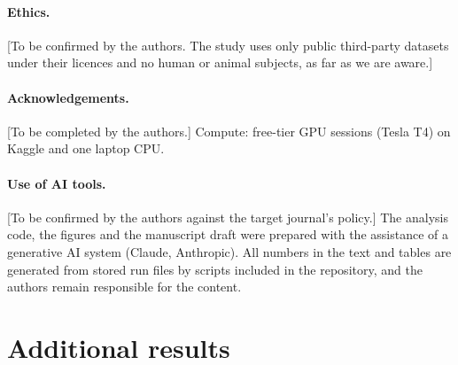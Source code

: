 \documentclass[11pt]{article}
\newcommand{\todo}[1]{{\color{red}[#1]}}
\newcommand{\iou}{IoU}
\begin{document}
\paragraph{Ethics.} \todo{To be confirmed by the authors. The study uses only public third-party datasets under their licences and no human or animal subjects, as far as we are aware.}
\paragraph{Acknowledgements.} \todo{To be completed by the authors.} Compute: free-tier GPU sessions (Tesla T4) on Kaggle and one laptop CPU.
\paragraph{Use of AI tools.} \todo{To be confirmed by the authors against the target journal's policy.} The analysis code, the figures and the manuscript draft were prepared with the assistance of a generative AI system (Claude, Anthropic). All numbers in the text and tables are generated from stored run files by scripts included in the repository, and the authors remain responsible for the content.



\appendix
\section{Additional results}
\begin{table}[H]\centering\small
\resizebox{\textwidth}{!}{}
\caption{B-strict F1 (\%) of the landslide class, mean $\pm$ std over seeds ($^\dagger$ one seed, $^\ddagger$ two).}\label{tab:f1}
\end{table}
\begin{table}[H]\centering\small
\resizebox{\textwidth}{!}{}
\caption{B-strict expected calibration error (pixel-level, 15 bins), mean $\pm$ std over seeds ($^\dagger$ one seed, $^\ddagger$ two).}\label{tab:ece}
\end{table}
\begin{table}[H]\centering\small

\caption{B-strict landslide \iou{} (\%) per seed.}\label{tab:perseed}
\end{table}
\begin{table}[H]\centering\small

\caption{Per-region or per-event landslide \iou{} (\%) for SegFormer-B0 under size-matched plain B (seed 0), ascending.}\label{tab:regions}
\end{table}
\end{document}
